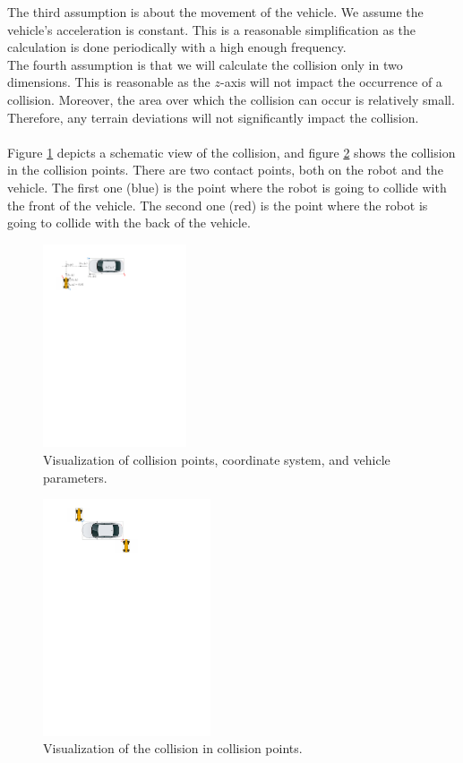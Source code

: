         The third assumption is about the movement of the vehicle. We assume the vehicle's acceleration is constant. This is a reasonable simplification as the calculation is done periodically with a high enough frequency.\\
        The fourth assumption is that we will calculate the collision only in two dimensions. This is reasonable as the $z$-axis will not impact the occurrence of a collision. Moreover, the area over which the collision can occur is relatively small. Therefore, any terrain deviations will not significantly impact the collision.\\\\
        Figure \ref{fig:collision} depicts a schematic view of the collision, and figure \ref{fig:collided} shows the collision in the collision points. There are two contact points, both on the robot and the vehicle. The first one (blue) is the point where the robot is going to collide with the front of the vehicle. The second one (red) is the point where the robot is going to collide with the back of the vehicle.\\
        \begin{figure}[ht]
            \centering
            \includegraphics[height=6cm]{images/collision.pdf}
            \caption{Visualization of collision points, coordinate system, and vehicle parameters.}
            \label{fig:collision}
        \end{figure}
        \begin{figure}[ht]
            \centering
            \includegraphics[height=7cm]{images/collided.pdf}
            \caption{Visualization of the collision in collision points.}
            \label{fig:collided}
        \end{figure}
